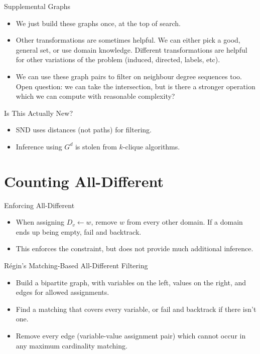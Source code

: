 \documentclass{beamer}
\begin{document}
\begin{frame}{Supplemental Graphs}
    \begin{itemize}
        \item We just build these graphs once, at the top of search.

        \item Other transformations are sometimes helpful. We can either pick a good, general set,
            or use domain knowledge. Different transformations are helpful for other variations of
            the problem (induced, directed, labels, etc).

        \item We can use these graph pairs to filter on neighbour degree sequences too.
            Open question: we can take the intersection, but is there a stronger operation
            which we can compute with reasonable complexity?
    \end{itemize}
\end{frame}

\begin{frame}{Is This Actually New?}
    \begin{itemize}
        \item SND uses distances (not paths) for filtering.

        \item Inference using $G^d$ is stolen from $k$-clique algorithms.
    \end{itemize}
\end{frame}

\section{Counting All-Different}

\begin{frame}{Enforcing All-Different}
    \begin{itemize}
        \item When assigning $D_v \gets w$, remove $w$ from every other domain. If a domain ends up
            being empty, fail and backtrack.

        \item This enforces the constraint, but does not provide much additional inference.
    \end{itemize}
\end{frame}

\begin{frame}{R\'egin's Matching-Based All-Different Filtering}
    \begin{itemize}
        \item Build a bipartite graph, with variables on the left, values on
            the right, and edges for allowed assignments.

        \item Find a matching that covers every variable, or fail and backtrack if there isn't
            one.

        \item Remove every edge (variable-value assignment pair) which cannot occur in any
            maximum cardinality matching.
    \end{itemize}
\end{frame}
\end{document}
